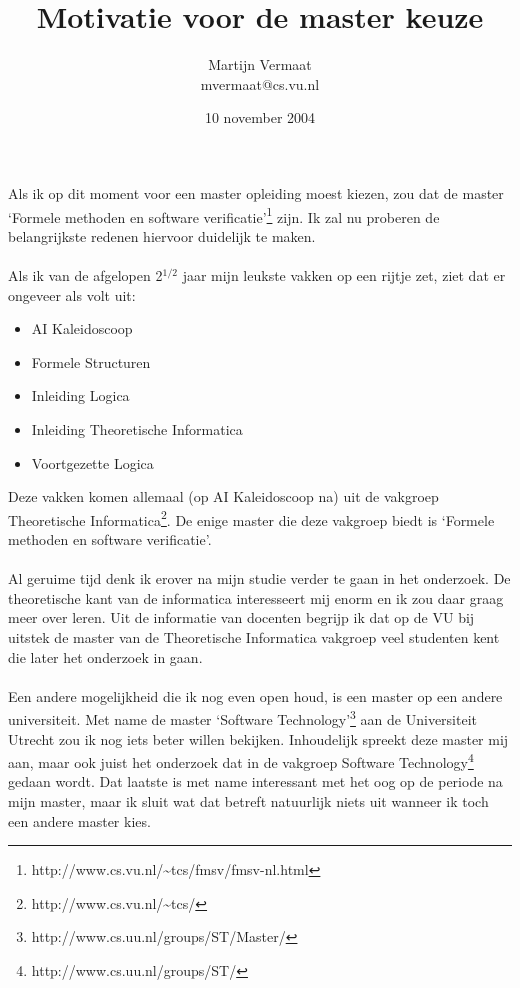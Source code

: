 \documentclass[a4paper,11pt]{artikel3} %
\title{Motivatie voor de master keuze}
\author{
    Martijn Vermaat\\
    mvermaat@cs.vu.nl
}
\date{10 november 2004}
\begin{document}
\maketitle


Als ik op dit moment voor een master opleiding moest kiezen, zou dat de master
`Formele methoden en software
verificatie'\footnote{http://www.cs.vu.nl/\~{}tcs/fmsv/fmsv-nl.html} zijn. Ik zal
nu proberen de belangrijkste redenen hiervoor duidelijk te maken.

\paragraph{}

Als ik van de afgelopen 2$^{1/2}$ jaar mijn leukste vakken op een rijtje zet,
ziet dat er ongeveer als volt uit:

\begin{itemize}
\item AI Kaleidoscoop
\item Formele Structuren
\item Inleiding Logica
\item Inleiding Theoretische Informatica
\item Voortgezette Logica
\end{itemize}

Deze vakken komen allemaal (op AI Kaleidoscoop na) uit de vakgroep
Theoretische Informatica\footnote{http://www.cs.vu.nl/\~{}tcs/}. De enige master
die deze vakgroep biedt is `Formele methoden en software verificatie'.

\paragraph{}

Al geruime tijd denk ik erover na mijn studie verder te gaan in het
onderzoek. De theoretische kant van de informatica interesseert mij enorm en
ik zou daar graag meer over leren. Uit de informatie van docenten begrijp ik
dat op de VU bij uitstek de master van de Theoretische Informatica vakgroep
veel studenten kent die later het onderzoek in gaan.

\paragraph{}

Een andere mogelijkheid die ik nog even open houd, is een master op een andere
universiteit. Met name de master `Software
Technology'\footnote{http://www.cs.uu.nl/groups/ST/Master/} aan de
Universiteit Utrecht zou ik nog iets beter willen bekijken. Inhoudelijk
spreekt deze master mij aan, maar ook juist het onderzoek dat in de vakgroep
Software Technology\footnote{http://www.cs.uu.nl/groups/ST/} gedaan wordt. Dat
laatste is met name interessant met het oog op de periode na mijn master, maar
ik sluit wat dat betreft natuurlijk niets uit wanneer ik toch een andere
master kies.
\end{document}
